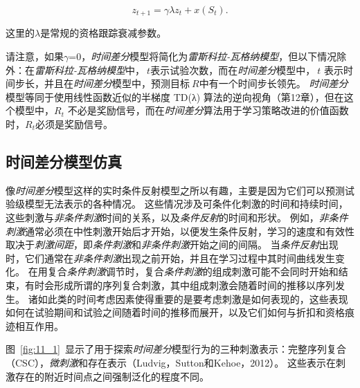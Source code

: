 \begin{equation}\label{key}
	z_{t+1} = \gamma \lambda z_t 
	+ x(S_t).
\end{equation}

这里的$\lambda$是常规的资格跟踪衰减参数。

请注意，如果$\gamma$=0，\textit{时间差分}模型将简化为\textit{雷斯科拉-瓦格纳模型}，但以下情况除外：在\textit{雷斯科拉-瓦格纳模型}中，$\ t$表示试验次数，而在\textit{时间差分}模型中，$\ t$
表示时间步长，并且在\textit{时间差分}模型中，预测目标$\ R$中有一个时间步长领先。
\textit{时间差分}模型等同于使用线性函数近似的半梯度 TD(λ) 算法的逆向视角（第12章），但在这个模型中，$ R_t$ 不必是奖励信号，而在\textit{时间差分}算法用于学习策略改进的价值函数时，$ R_t$必须是奖励信号。



\subsection{时间差分模型仿真} \label{sec:td_simulation}

像\textit{时间差分}模型这样的实时条件反射模型之所以有趣，主要是因为它们可以预测试验级模型无法表示的各种情况。
这些情况涉及可条件化刺激的时间和持续时间，这些刺激与\textit{非条件刺激}时间的关系，以及\textit{条件反射}的时间和形状。
例如，\textit{非条件刺激}通常必须在中性刺激开始后才开始，以便发生条件反射，学习的速度和有效性取决于\textit{刺激间距}，即\textit{条件刺激}和\textit{非条件刺激}开始之间的间隔。
当\textit{条件反射}出现时，它们通常在\textit{非条件刺激}出现之前开始，并且在学习过程中其时间曲线发生变化。
在用复合\textit{条件刺激}调节时，复合\textit{条件刺激}的组成刺激可能不会同时开始和结束，有时会形成所谓的序列复合刺激，其中组成刺激会随着时间的推移以序列发生。
诸如此类的时间考虑因素使得重要的是要考虑刺激是如何表现的，这些表现如何在试验期间和试验之间随着时间的推移而展开，以及它们如何与折扣和资格痕迹相互作用。


图~\ref{fig:11_1}~显示了用于探索\textit{时间差分}模型行为的三种刺激表示：完整序列复合（CSC），\textit{微刺激}和存在表示（Ludvig，Sutton和Kehoe，2012）。
这些表示在刺激存在的附近时间点之间强制泛化的程度不同。


